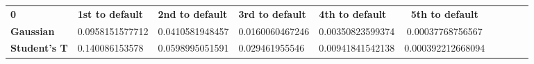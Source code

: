 \begin{center}
 \begin{tabular}{|l|l|l|l|l|c|c|c|c|c|}
\hline
\textbf{0} & \textbf{1st to default} & \textbf{2nd to default} & \textbf{3rd to default} & \textbf{4th to default} & \textbf{5th to default}\\\hhline{|=|=|=|=|=|=|}
\textbf{Gaussian} & 0.0958151577712 & 0.0410581948457 & 0.0160060467246 & 0.00350823599374 & 0.00037768756567\\
\textbf{Student's T} & 0.140086153578 & 0.0598995051591 & 0.029461955546 & 0.00941841542138 & 0.000392212668094\\
\hline
\end{tabular}
\end{center}